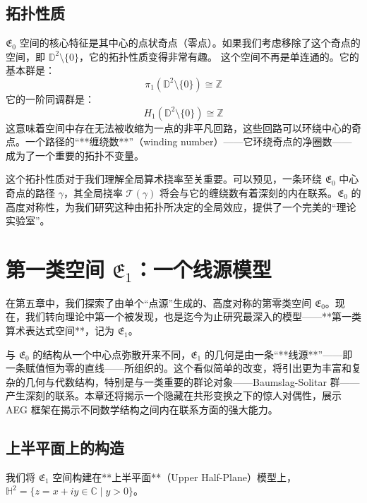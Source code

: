 \documentclass[a4paper,12pt]{book}
\numberwithin{problem}{section}
\numberwithin{definition}{section}
\numberwithin{lemma}{section}
\numberwithin{proposition}{section}
\numberwithin{theorem}{section}
\numberwithin{grammar}{section}
\numberwithin{program}{section}
\numberwithin{convention}{section}
\numberwithin{corollary}{section}
\begin{document}
\section{拓扑性质}
\label{sec:e0_topology}

$\mathfrak{E}_0$ 空间的核心特征是其中心的点状奇点（零点）。如果我们考虑移除了这个奇点的空间，即 $\mathbb{D}^2 \setminus \{0\}$，它的拓扑性质变得非常有趣。
这个空间不再是单连通的。它的基本群是：
\[ \pi_1(\mathbb{D}^2 \setminus \{0\}) \cong \mathbb{Z} \]
它的一阶同调群是：
\[ H_1(\mathbb{D}^2 \setminus \{0\}) \cong \mathbb{Z} \]
这意味着空间中存在无法被收缩为一点的非平凡回路，这些回路可以环绕中心的奇点。一个路径的“**缠绕数**”（winding number）——它环绕奇点的净圈数——成为了一个重要的拓扑不变量。

这个拓扑性质对于我们理解全局算术挠率至关重要。可以预见，一条环绕 $\mathfrak{E}_0$ 中心奇点的路径 $\gamma$，其全局挠率 $\mathcal{T}(\gamma)$ 将会与它的缠绕数有着深刻的内在联系。$\mathfrak{E}_0$ 的高度对称性，为我们研究这种由拓扑所决定的全局效应，提供了一个完美的“理论实验室”。


\chapter{第一类空间 \texorpdfstring{$\mathfrak{E}_1$}{E1}：一个线源模型}
\label{chap:space_e1}

在第五章中，我们探索了由单个“点源”生成的、高度对称的第零类空间 $\mathfrak{E}_0$。现在，我们转向理论中第一个被发现，也是迄今为止研究最深入的模型——**第一类算术表达式空间**，记为 $\mathfrak{E}_1$。

与 $\mathfrak{E}_0$ 的结构从一个中心点弥散开来不同，$\mathfrak{E}_1$ 的几何是由一条“**线源**”——即一条赋值恒为零的直线——所组织的。这个看似简单的改变，将引出更为丰富和复杂的几何与代数结构，特别是与一类重要的群论对象——Baumslag-Solitar 群——产生深刻的联系。本章还将揭示一个隐藏在共形变换之下的惊人对偶性，展示 AEG 框架在揭示不同数学结构之间内在联系方面的强大能力。

\section{上半平面上的构造}
\label{sec:e1_construction}

我们将 $\mathfrak{E}_1$ 空间构建在**上半平面**（Upper Half-Plane）模型上，$\mathbb{H}^2 = \{z=x+iy \in \mathbb{C} \mid y>0\}$。
\end{document}
